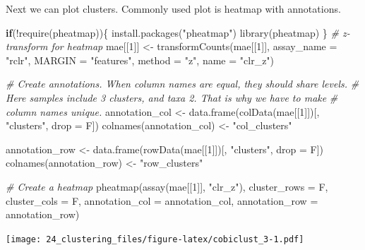 \documentclass[
]{book}
\newenvironment{Shaded}{\begin{snugshade}}{\end{snugshade}}
\newcommand{\AttributeTok}[1]{\textcolor[rgb]{0.77,0.63,0.00}{#1}}
\newcommand{\CommentTok}[1]{\textcolor[rgb]{0.56,0.35,0.01}{\textit{#1}}}
\newcommand{\ControlFlowTok}[1]{\textcolor[rgb]{0.13,0.29,0.53}{\textbf{#1}}}
\newcommand{\DecValTok}[1]{\textcolor[rgb]{0.00,0.00,0.81}{#1}}
\newcommand{\FunctionTok}[1]{\textcolor[rgb]{0.00,0.00,0.00}{#1}}
\newcommand{\NormalTok}[1]{#1}
\newcommand{\OtherTok}[1]{\textcolor[rgb]{0.56,0.35,0.01}{#1}}
\newcommand{\SpecialCharTok}[1]{\textcolor[rgb]{0.00,0.00,0.00}{#1}}
\newcommand{\StringTok}[1]{\textcolor[rgb]{0.31,0.60,0.02}{#1}}
\begin{document}
Next we can plot clusters. Commonly used plot is heatmap with annotations.

\begin{Shaded}
\begin{Highlighting}[]
\ControlFlowTok{if}\NormalTok{(}\SpecialCharTok{!}\FunctionTok{require}\NormalTok{(pheatmap))\{}
    \FunctionTok{install.packages}\NormalTok{(}\StringTok{"pheatmap"}\NormalTok{)}
    \FunctionTok{library}\NormalTok{(pheatmap)}
\NormalTok{\}}
\CommentTok{\# z{-}transform for heatmap}
\NormalTok{mae[[}\DecValTok{1}\NormalTok{]] }\OtherTok{\textless{}{-}} \FunctionTok{transformCounts}\NormalTok{(mae[[}\DecValTok{1}\NormalTok{]], }\AttributeTok{assay\_name =} \StringTok{"rclr"}\NormalTok{,}
                            \AttributeTok{MARGIN =} \StringTok{"features"}\NormalTok{,}
                            \AttributeTok{method =} \StringTok{"z"}\NormalTok{, }\AttributeTok{name =} \StringTok{"clr\_z"}\NormalTok{)}

\CommentTok{\# Create annotations. When column names are equal, they should share levels. }
\CommentTok{\# Here samples include 3 clusters, and taxa 2. That is why we have to make }
\CommentTok{\# column names unique. }
\NormalTok{annotation\_col }\OtherTok{\textless{}{-}} \FunctionTok{data.frame}\NormalTok{(}\FunctionTok{colData}\NormalTok{(mae[[}\DecValTok{1}\NormalTok{]])[, }\StringTok{"clusters"}\NormalTok{, }\AttributeTok{drop =}\NormalTok{ F])}
\FunctionTok{colnames}\NormalTok{(annotation\_col) }\OtherTok{\textless{}{-}} \StringTok{"col\_clusters"}

\NormalTok{annotation\_row }\OtherTok{\textless{}{-}} \FunctionTok{data.frame}\NormalTok{(}\FunctionTok{rowData}\NormalTok{(mae[[}\DecValTok{1}\NormalTok{]])[, }\StringTok{"clusters"}\NormalTok{, }\AttributeTok{drop =}\NormalTok{ F])}
\FunctionTok{colnames}\NormalTok{(annotation\_row) }\OtherTok{\textless{}{-}} \StringTok{"row\_clusters"}

\CommentTok{\# Create a heatmap}
\FunctionTok{pheatmap}\NormalTok{(}\FunctionTok{assay}\NormalTok{(mae[[}\DecValTok{1}\NormalTok{]], }\StringTok{"clr\_z"}\NormalTok{), }\AttributeTok{cluster\_rows =}\NormalTok{ F, }\AttributeTok{cluster\_cols =}\NormalTok{ F, }
         \AttributeTok{annotation\_col =}\NormalTok{ annotation\_col,}
         \AttributeTok{annotation\_row =}\NormalTok{ annotation\_row)}
\end{Highlighting}
\end{Shaded}

\texttt{[image: 24\_clustering\_files/figure-latex/cobiclust\_3-1.pdf]}
\end{document}
